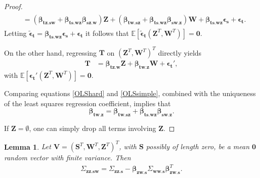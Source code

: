 \documentclass[11pt,a4paper]{article}
\newtheorem{Lemma}[Satz]{Lemma}
\theoremstyle{definition}
\theoremstyle{remark}
\begin{document}
\begin{proof}
\begin{align}
\begin{split}
&= (\boldsymbol{\beta}_{\mathbf{tz}.\mathbf{s}\mathbf{w}} + 
\boldsymbol{\beta}_{\mathbf{ts}.\mathbf{w}\mathbf{z}} \boldsymbol{\beta}_{\mathbf{s}\mathbf{z}.\mathbf{w}}) \mathbf{Z} + (\boldsymbol{\beta}_{\mathbf{tw}.\mathbf{s}\mathbf{z}}  + \boldsymbol{\beta}_{\mathbf{ts}.\mathbf{w}\mathbf{z}} \boldsymbol{\beta}_{\mathbf{s}\mathbf{w}.\mathbf{z}}) \mathbf{W}  + \boldsymbol{\beta}_{\mathbf{ts}.\mathbf{wz}} \boldsymbol{\epsilon}_{\mathbf{s}} 
+ \boldsymbol{\epsilon}_{\mathbf{t}}.  
\end{split}
\label{OLShard}
\end{align}
Letting $\boldsymbol{\tilde{\epsilon}}_{\mathbf{t}}=\boldsymbol{\beta}_{\mathbf{ts}.\mathbf{wz}} \boldsymbol{\epsilon}_{\mathbf{s}} + \boldsymbol{\epsilon}_{\mathbf{t}}$ it follows that 
$\mathbb{E}[\boldsymbol{\tilde{\epsilon}}_{\mathbf{t}}(\mathbf{Z}^T,\mathbf{W}^T)]=\boldsymbol{0}.$


On the other hand, regressing $\mathbf{T}$ on $(\mathbf{Z}^T,\mathbf{W}^T)^T$ directly yields
\begin{align}
\mathbf{T} &= \boldsymbol{\beta}_{\mathbf{tz}.\mathbf{w}} \mathbf{Z} +
\boldsymbol{\beta}_{\mathbf{tw}.\mathbf{z}} \mathbf{W} + \boldsymbol{{\epsilon}}_{\mathbf{t}}',  
\label{OLSsimple}
\end{align}
with $\mathbb{E}[\boldsymbol{\epsilon}_{\mathbf{t}}' (\mathbf{Z}^T,\mathbf{W}^T)] = \boldsymbol{0}$. 


Comparing equations \eqref{OLShard} and \eqref{OLSsimple}, combined with the uniqueness of the least squares regression coefficient, implies that
\begin{equation}
\boldsymbol{\beta}_{\mathbf{tw}.\mathbf{z}} = \boldsymbol{\beta}_{\mathbf{tw}.\mathbf{s}\mathbf{z}} 
+ \boldsymbol{\beta}_{\mathbf{ts}.\mathbf{w}\mathbf{z}} \boldsymbol{\beta}_{\mathbf{s}\mathbf{w}.\mathbf{z}}.
\nonumber 
\end{equation}

If $\mathbf{Z}=\emptyset$, one can simply drop all terms involving $\mathbf{Z}$. 

\end{proof}%


\begin{Lemma}
Let $\mathbf{V}=(\mathbf{S}^T,\mathbf{W}^T,\mathbf{Z}^T)^T$, with $\mathbf{S}$ possibly of length zero, be a mean $\mathbf{0}$ random vector with finite variance. Then 
\begin{align*}
\Sigma_{\mathbf{zz}.\mathbf{sw}} = \Sigma_{\mathbf{zz}.\mathbf{s}} - \boldsymbol{\beta}_{\mathbf{zw}.\mathbf{s}} \Sigma_{\mathbf{ww}.\mathbf{s}} \boldsymbol{\beta}^T_{\mathbf{zw}.\mathbf{s}}.
\end{align*}
\label{convarsets}
\end{Lemma}
\end{document}
